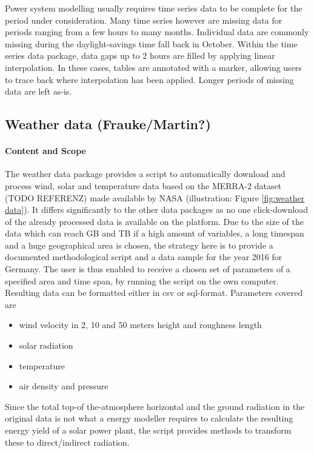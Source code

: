 \documentclass[article]{elsarticle}
\begin{document}
Power system modelling usually requires time series data to be complete for the period under consideration. Many time series however are missing data for periods ranging from a few hours to many months. Individual data are commonly missing during the daylight-savings time fall back in October. Within the time series data package, data gaps up to 2 hours are filled by applying linear interpolation. In these cases, tables are annotated with a marker, allowing users to trace back where interpolation has been applied. Longer periods of missing data are left as-is.

\subsection{Weather data (Frauke/Martin?)}

\paragraph{Content and Scope}
The weather data package provides a script to automatically download and process wind, solar and temperature data based on the MERRA-2 dataset (TODO REFERENZ) made available by NASA (illustration: Figure \ref{fig:weather data}). It differs significantly to the other data packages as no one click-download of the already processed data is available on the platform. Due to the size of the data which can reach GB and TB if a high amount of variables, a long timespan and a huge geographical area is chosen, the strategy here is to provide a documented methodological script and a data sample for the year 2016 for Germany. The user is thus enabled to receive a chosen set of parameters of a specified area and time span, by running the script on the own computer. Resulting data can be formatted either in csv or sql-format. Parameters covered are
\begin{itemize}
 \item wind velocity in 2, 10 and 50 meters height and roughness length
 \item solar radiation
 \item temperature
 \item air density and pressure
\end{itemize}

Since the total top-of the-atmosphere horizontal and the ground radiation in the original data is not what a energy modeller requires to calculate the resulting energy yield of a solar power plant, the script provides methods to transform these to direct/indirect radiation.
\end{document}
